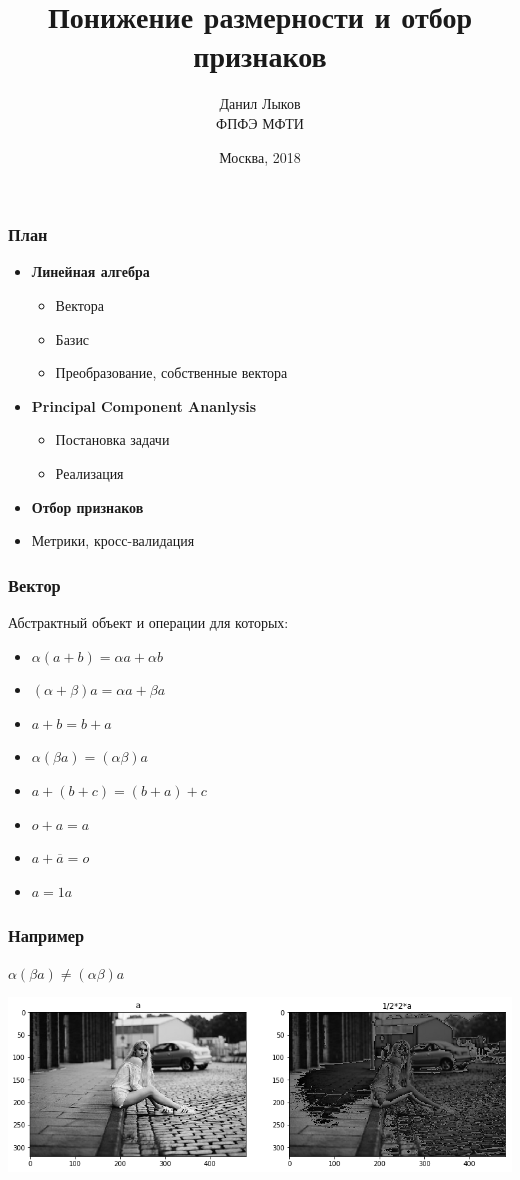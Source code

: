 \documentclass[14pt]{beamer}
\title{\small{Понижение размерности и отбор признаков}}
\author{\small{%
	Данил Лыков
}\\%
\vspace{30pt}%
ФПФЭ МФТИ
\vspace{20pt}%
}
\date{\small{Москва, 2018}}
\begin{document}
\maketitle
\begin{frame}
\frametitle{План}
\begin{itemize}
  \item \textbf{Линейная алгебра} 
	  \begin {itemize}
		\item  Вектора
		\item  Базис
		\item  Преобразование, собственные вектора
	  \end {itemize}
  \item \textbf{Principal Component Ananlysis} 
	  \begin {itemize}
		\item  Постановка задачи
		\item  Реализация
	  \end {itemize}
  \item \textbf{Отбор признаков} 
  \item{Метрики, кросс-валидация} 
\end{itemize}
\end{frame} 

\begin{frame}
	\frametitle{Вектор}
	Абстрактный объект и операции для которых:
		\pause
	  \begin{itemize}
		  \item \( \alpha (a + b) = \alpha a + \alpha b\)
		  \item \( (\alpha + \beta )a = \alpha a + \beta a\)
			  \vspace{3pt}
			  \pause
		  \item \( a+b = b+a \)
		  \item \( \alpha (\beta a) = (\alpha \beta)a\)
		  \item \( a+(b+c) = (b+a)+c \)
			  \vspace{3pt}
			  \pause
		  \item \( o + a= a \)
		  \item \( a + \overline{a} = o\)
		  \item \( a=1a\)
	  \end{itemize}
\end{frame}

\begin{frame}
\frametitle{Например}
	\vspace{-2em}
	\begin{center}
	   \( \alpha (\beta a) \neq (\alpha \beta)a\)
	\end{center}
    \includegraphics[width=\textwidth]{girl-ok.png}
\end{frame}
\end{document}

